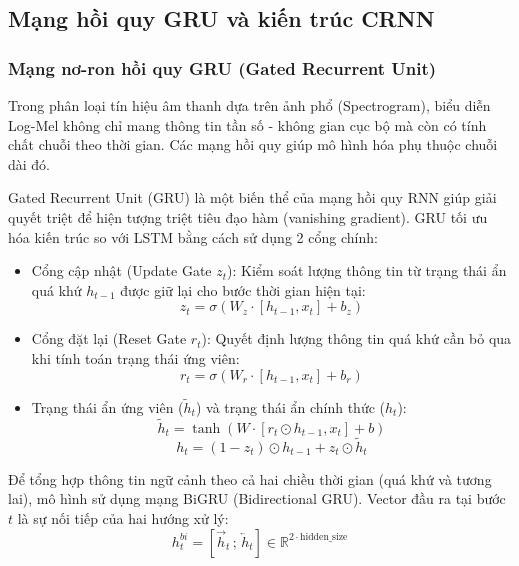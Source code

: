 \documentclass[a4paper,13pt]{extarticle}
\begin{document}
\subsection{Mạng hồi quy GRU và kiến trúc CRNN}

\subsubsection{Mạng nơ-ron hồi quy GRU (Gated Recurrent Unit)}
Trong phân loại tín hiệu âm thanh dựa trên ảnh phổ (Spectrogram), biểu diễn Log-Mel không chỉ mang thông tin tần số - không gian cục bộ mà còn có tính chất chuỗi theo thời gian. Các mạng hồi quy giúp mô hình hóa phụ thuộc chuỗi dài đó. 

Gated Recurrent Unit (GRU) là một biến thể của mạng hồi quy RNN giúp giải quyết triệt để hiện tượng triệt tiêu đạo hàm (vanishing gradient). GRU tối ưu hóa kiến trúc so với LSTM bằng cách sử dụng 2 cổng chính:
\begin{itemize}
    \item[-] {Cổng cập nhật (Update Gate $z_t$):} Kiểm soát lượng thông tin từ trạng thái ẩn quá khứ $h_{t-1}$ được giữ lại cho bước thời gian hiện tại:
    \begin{equation*}
        z_t = \sigma(W_z \cdot [h_{t-1}, x_t] + b_z)
    \end{equation*}
    \item[-] {Cổng đặt lại (Reset Gate $r_t$):} Quyết định lượng thông tin quá khứ cần bỏ qua khi tính toán trạng thái ứng viên:
    \begin{equation*}
        r_t = \sigma(W_r \cdot [h_{t-1}, x_t] + b_r)
    \end{equation*}
    \item[-] {Trạng thái ẩn ứng viên ($\tilde{h}_t$) và trạng thái ẩn chính thức ($h_t$):}
    \begin{equation*}
        \tilde{h}_t = \tanh(W \cdot [r_t \odot h_{t-1}, x_t] + b)
    \end{equation*}
    \begin{equation*}
        h_t = (1 - z_t) \odot h_{t-1} + z_t \odot \tilde{h}_t
    \end{equation*}
\end{itemize}

Để tổng hợp thông tin ngữ cảnh theo cả hai chiều thời gian (quá khứ và tương lai), mô hình sử dụng mạng {BiGRU (Bidirectional GRU)}. Vector đầu ra tại bước $t$ là sự nối tiếp của hai hướng xử lý:
\begin{equation*}
    h_t^{bi} = [\overrightarrow{h}_t \,;\, \overleftarrow{h}_t] \in \mathbb{R}^{2 \cdot \text{hidden\_size}}
\end{equation*}
\end{document}
